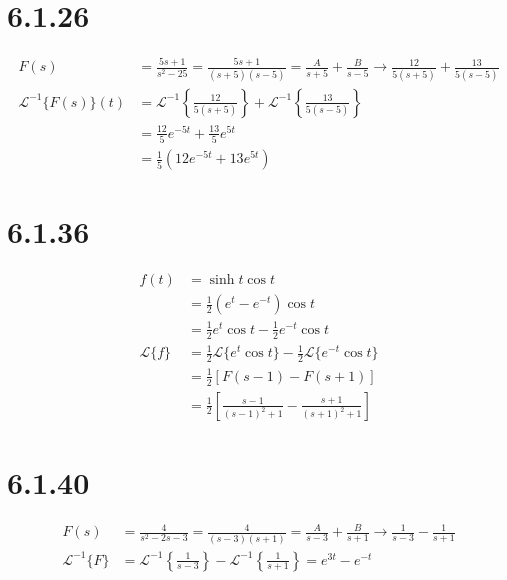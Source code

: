 \documentclass[11pt,a4paper]{article}
\newcommand{\Laplace}{\mathcal{L}}
\begin{document}
\section*{6.1.26}
\begin{align*}
	F(s) 
	&= \frac{5s+1}{s^2-25}
	= \frac{5s+1}{(s+5)(s-5)} 
	= \frac{A}{s+5} + \frac{B}{s-5}
	\rightarrow \frac{12}{5(s+5)} + \frac{13}{5(s-5)} \\
	\Laplace^{-1}\{F(s)\}(t) 
	&= \Laplace^{-1}\left\{\frac{12}{5(s+5)}\right\} + \Laplace^{-1}\left\{\frac{13}{5(s-5)}\right\} \\
	&= \frac{12}{5} e^{-5t} + \frac{13}{5} e^{5t} \\
	&= \frac{1}{5} (12e^{-5t} + 13e^{5t})
\end{align*}

\section*{6.1.36}
\begin{align*}
	f(t) 
	&= \sinh t \cos t \\
	&= \frac{1}{2} (e^t - e^{-t}) \cos t \\
	&= \frac{1}{2} e^t \cos t - \frac{1}{2} e^{-t} \cos t \\
	\Laplace\{f\}
	&= \frac{1}{2} \Laplace\{e^t\cos t\} - \frac{1}{2} \Laplace\{e^{-t}\cos t\} \\
	&= \frac{1}{2} [F(s-1) - F(s+1)] \\
	&= \frac{1}{2} \left[
		\frac{s-1}{(s-1)^2 + 1} - \frac{s+1}{(s+1)^2 + 1}
	\right]
\end{align*}

\section*{6.1.40}
\begin{align*}
	F(s)
	&= \frac{4}{s^2 - 2s - 3}
	= \frac{4}{(s-3)(s+1)}
	= \frac{A}{s-3} + \frac{B}{s+1}
	\rightarrow \frac{1}{s-3} - \frac{1}{s+1} \\
	\Laplace^{-1}\{F\}
	&= \Laplace^{-1}\left\{\frac{1}{s-3}\right\} - \Laplace^{-1}\left\{\frac{1}{s+1}\right\}
	= e^{3t} - e^{-t}
\end{align*}
\end{document}
